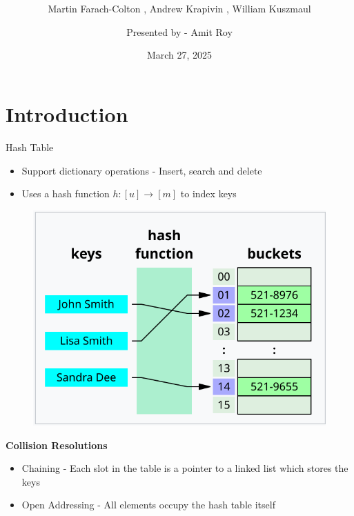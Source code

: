 \documentclass{beamer}
\title{ \sc \color{blue}{Optimal Bounds for Open Addressing Without Reordering}}
\subtitle{Martin Farach-Colton , Andrew Krapivin , William Kuszmaul}
\author{Presented by - Amit Roy }
\institute{}
\date{March 27, 2025}
\begin{document}
 
\begin{frame}
\titlepage
\end{frame} 



\section{Introduction}

\begin{frame}{Hash Table}
	\begin{itemize}
		\item Support dictionary operations - {\sc Insert, search} and {\sc delete} 
		\item Uses a hash function $h:[u]\to [m]$ to index keys
	\end{itemize}

\begin{figure}
	\includegraphics[scale=0.5]{images/hashing.png}
\end{figure}

\end{frame}
\begin{frame}
	{\bf Collision Resolutions}
	\begin{itemize}
		\item Chaining - Each slot in the table is a pointer to a linked list which stores the keys
		\item Open Addressing - All elements occupy the hash table itself
	\end{itemize}
\end{frame}
\end{document}
